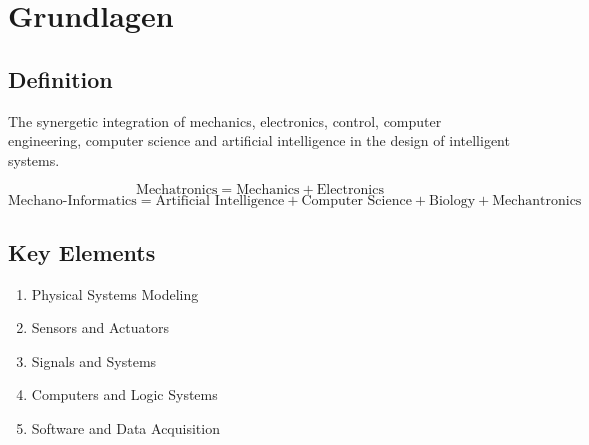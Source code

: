 

\section{Grundlagen}

\subsection{Definition}
The synergetic integration of mechanics, electronics, control, computer engineering, computer science and
artificial intelligence in the design of intelligent systems.

\[\text{Mechatronics} = \text{Mechanics} + \text{Electronics}\]
\[\text{Mechano-Informatics} = \text{Artificial Intelligence} + \text{Computer Science} + \text{Biology}
  + \text{Mechantronics}\]

\subsection{Key Elements}
\begin{enumerate}
\item Physical Systems Modeling
\item Sensors and Actuators
\item Signals and Systems
\item Computers and Logic Systems
\item Software and Data Acquisition
\end{enumerate}
